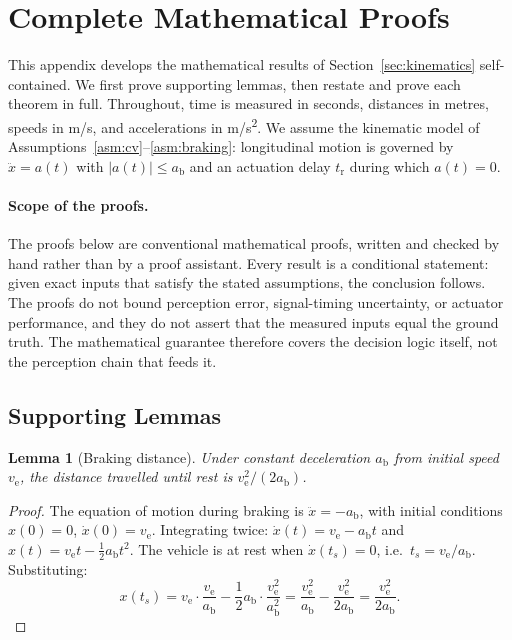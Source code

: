\documentclass[conference, a4paper]{IEEEtran}
\theoremstyle{plain}
\newtheorem{lemma}[theorem]{Lemma}
\newcommand{\ab}{a_{\mathrm{b}}}
\newcommand{\tr}{t_{\mathrm{r}}}
\newcommand{\ve}{v_{\mathrm{e}}}
\begin{document}
\section{Complete Mathematical Proofs}
\label{app:proofs}

This appendix develops the mathematical results of Section~\ref{sec:kinematics}
self-contained. We first prove supporting lemmas, then restate and prove each
theorem in full. Throughout, time is measured in seconds, distances in
metres, speeds in \si{m/s}, and accelerations in \si{m/s^2}. We assume the
kinematic model of Assumptions~\ref{asm:cv}--\ref{asm:braking}: longitudinal
motion is governed by $\ddot{x} = a(t)$ with $|a(t)| \leq \ab$ and an
actuation delay $\tr$ during which $a(t) = 0$.

\paragraph{Scope of the proofs.}
The proofs below are conventional mathematical proofs, written and checked
by hand rather than by a proof assistant. Every result is a conditional
statement: given exact inputs that
satisfy the stated assumptions, the conclusion follows. The proofs do not
bound perception error, signal-timing uncertainty, or actuator performance,
and they do not assert that the measured inputs equal the ground truth. The
mathematical guarantee therefore covers the decision logic itself, not the
perception chain that feeds it.

\subsection{Supporting Lemmas}

\begin{lemma}[Braking distance]
\label{lem:brakedist}
Under constant deceleration $\ab$ from initial speed $\ve$, the distance
travelled until rest is $\ve^2 / (2\ab)$.
\end{lemma}

\begin{proof}
The equation of motion during braking is $\ddot{x} = -\ab$, with initial
conditions $x(0)=0$, $\dot{x}(0)=\ve$. Integrating twice:
$\dot{x}(t) = \ve - \ab t$ and
$x(t) = \ve t - \tfrac{1}{2}\ab t^2$. The vehicle is at rest when
$\dot{x}(t_s) = 0$, i.e.\ $t_s = \ve/\ab$. Substituting:
\[
x(t_s) = \ve \cdot \frac{\ve}{\ab} - \frac{1}{2}\ab \cdot
\frac{\ve^2}{\ab^2}
= \frac{\ve^2}{\ab} - \frac{\ve^2}{2\ab}
= \frac{\ve^2}{2\ab}.
\]
\end{proof}
\end{document}
